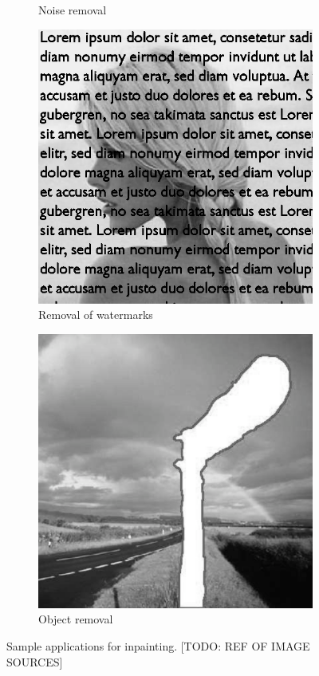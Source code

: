 \begin{figure}[t]
\begin{subfigure}{.5\columnwidth}
	      \caption{Noise removal
	      \label{fig:apps:noise_removal}
	   }
	\end{subfigure}\hfill%
	\begin{subfigure}{.5\columnwidth}
	   \centering
	   \includegraphics[width=.9\columnwidth]{graphics/claudia_512x512_mask_in.png}%
      	   \caption{Removal of watermarks
	      \label{fig:apps:watermarks}
	   }
	\end{subfigure}\hfill%
	\begin{subfigure}{.5\columnwidth}
	   \centering
	   \includegraphics[width=.9\columnwidth]{graphics/object_removal_gray.png}%
      	   \caption{Object removal
	      \label{fig:apps:watermarks}
	   }
	\end{subfigure}\hfill%
	\caption{Sample applications for inpainting. [TODO: REF OF IMAGE SOURCES]
	   \label{fig:apps}
	}
\end{figure}

